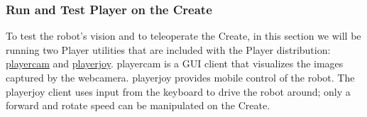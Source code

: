 \subsubsection{Run and Test Player on the Create}

To test the robot's vision and to teleoperate the Create, in this section we will be running two Player utilities that are included with the Player distribution: \href{http://playerstage.sourceforge.net/doc/Player-cvs/player/group__util__playercam.html}{playercam} and \href{http://playerstage.sourceforge.net/doc/Player-cvs/player/group__util__playerjoy.html}{playerjoy}. playercam is a GUI client that visualizes the images captured by the webcamera. playerjoy provides mobile control of the robot. The playerjoy client uses input from the keyboard to drive the robot around; only a forward and rotate speed can be manipulated on the Create.

